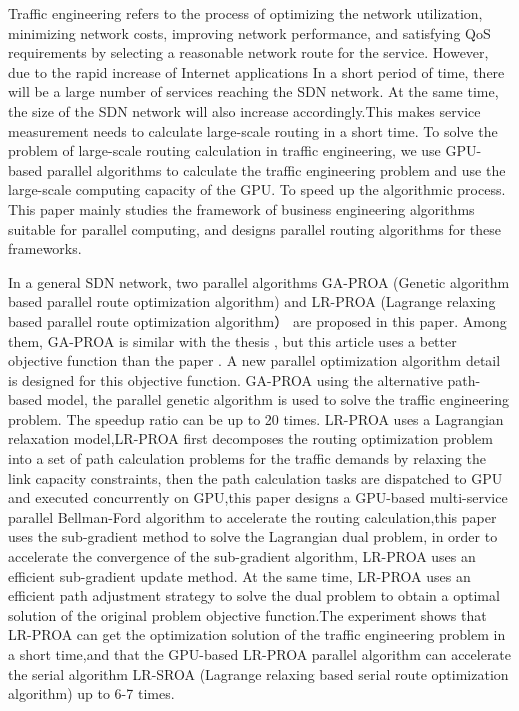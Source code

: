 \documentclass[master]{thesis-uestc}
\begin{document}
\begin{englishabstract}

Traffic engineering refers to the process of optimizing the network utilization, minimizing network costs, improving network performance, and satisfying QoS requirements by selecting a reasonable network route for the service. However, due to the rapid increase of Internet applications In a short period of time, there will be a large number of services reaching the SDN network. At the same time, the size of the SDN network will also increase accordingly.This makes service measurement needs to calculate large-scale routing in a short time. To solve the problem of large-scale routing calculation in traffic engineering, we use GPU-based parallel algorithms to calculate the traffic engineering problem and use the large-scale computing capacity of the GPU. To speed up the algorithmic process. This paper mainly studies the framework of business engineering algorithms suitable for parallel computing, and designs parallel routing algorithms for these frameworks.

In a general SDN network, two parallel algorithms GA-PROA (Genetic algorithm based parallel route optimization algorithm) and LR-PROA (Lagrange relaxing based parallel route optimization algorithm） are proposed in this paper. Among them, GA-PROA is similar with the thesis \cite{ParaTE2}, but this article uses a better objective function than the paper \cite{ParaTE2}. A new parallel optimization algorithm detail is designed for this objective function. GA-PROA using the alternative path-based model, the parallel genetic algorithm is used to solve the traffic engineering problem. The speedup ratio can be up to 20 times. LR-PROA uses a Lagrangian relaxation model,LR-PROA first decomposes the routing optimization problem into a set of path calculation problems for the traffic demands by relaxing the link capacity constraints, then the path calculation tasks are dispatched to GPU and executed concurrently on GPU,this paper designs a GPU-based multi-service parallel Bellman-Ford algorithm to accelerate the routing calculation,this paper uses the sub-gradient method to solve the Lagrangian dual problem, in order to accelerate the convergence of the sub-gradient algorithm, LR-PROA uses an efficient sub-gradient update method. At the same time, LR-PROA uses an efficient path adjustment strategy to solve the dual problem to obtain a optimal solution of the original problem objective function.The experiment shows that LR-PROA can get the optimization solution of the traffic engineering problem in a short time,and that the GPU-based LR-PROA parallel algorithm can accelerate the serial algorithm LR-SROA (Lagrange relaxing based serial route optimization algorithm) up to 6-7 times.


\end{englishabstract}
\end{document}
